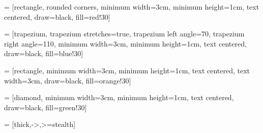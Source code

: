 %
%

 = [rectangle, rounded corners,
minimum width=3cm,
minimum height=1cm,
text centered,
draw=black,
fill=red!30] %

 = [trapezium,
trapezium stretches=true, %
trapezium left angle=70,
trapezium right angle=110,
minimum width=3cm,
minimum height=1cm, text centered,
draw=black, fill=blue!30] %

 = [rectangle,
minimum width=3cm,
minimum height=1cm,
text centered,
text width=3cm,
draw=black,
fill=orange!30] %

 = [diamond,
minimum width=3cm,
minimum height=1cm,
text centered,
draw=black,
fill=green!30] %

 = [thick,->,>=stealth] %

